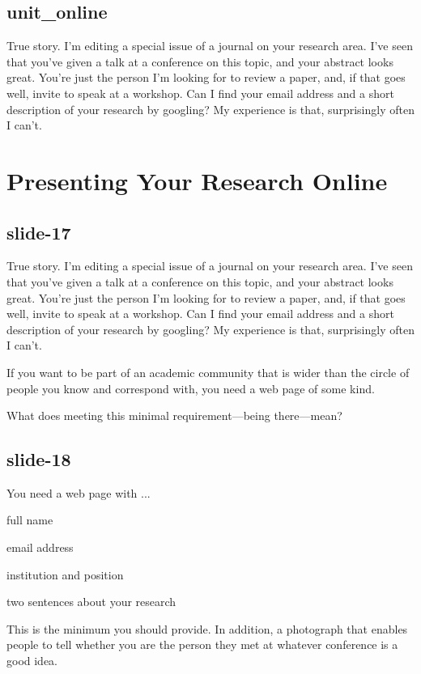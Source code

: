 \documentclass[12pt,\papersize]{extarticle}
\begin{document}
\subsection{unit\_online}
True story.  I'm editing a special issue of a journal on your research area. I've seen that you've given a talk at a conference on this topic, and your abstract looks great. You're just the person I'm looking for to review a paper, and, if that goes well, invite to speak at a workshop. Can I find your email address and a short description of your research by googling? My experience is that, surprisingly often I can't.
 
 
 
\section{Presenting Your Research Online}
 
\subsection{slide-17}
True story.  I'm editing a special issue of a journal on your research area.
I've seen that you've given a talk at a conference on this topic, and your abstract looks great.
You're just the person I'm looking for to review a paper, and, if that goes well, invite to speak
at a workshop.
Can I find your email address and a short description of your research by googling?
My experience is that, surprisingly often I can't.
 
If you want to be part of an academic community that is wider than the circle of people you know 
and correspond with, you need a web page of some kind.
 
What does meeting this minimal requirement---being there---mean?
 
\subsection{slide-18}
You need a web page with ...
 
full name

            
email address

            
institution and position

            
two sentences about your research
 
This is the minimum you should provide.  
In addition, a photograph that enables people to tell whether you are the person they
met at whatever conference is a good idea.
 
\end{document}
